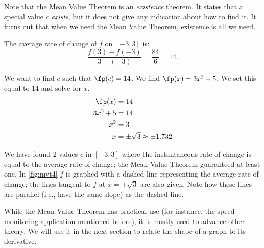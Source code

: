 Note that the Mean Value Theorem is an \textit{existence} theorem. It states that a special value $c$ \textit{exists}, but it does not give any indication about how to find it. It turns out that when we need the Mean Value Theorem, existence is all we need.\\


{The average rate of change of $f$ on $[-3,3]$ is:
		$$\frac{f(3)-f(-3)}{3-(-3)} = \frac{84}{6} = 14.$$
		
We want to find $c$ such that $\fp(c) = 14$. We find $\fp(x) = 3x^2+5$. We set this equal to 14 and solve for $x$. 
		\begin{align*}
		\fp(x) &= 14 \\
		3x^2 +5 &= 14\\
		x^2  &= 3\\
		x &= \pm \sqrt{3} \approx \pm 1.732
		\end{align*}
		

We have found 2 values $c$ in $[-3,3]$ where the instantaneous rate of change is equal to the average rate of change; the Mean Value Theorem guaranteed at least one. In \autoref{fig:mvt4} $f$ is graphed with a dashed line representing the average rate of change; the lines tangent to $f$ at $x=\pm \sqrt{3}$ are also given. Note how these lines are parallel (i.e., have the same slope) as the dashed line.}

While the Mean Value Theorem has practical use (for instance, the speed monitoring application mentioned before), it is mostly used to advance other theory. We will use it in the next section to relate  the shape of a graph to its derivative.\\

%

